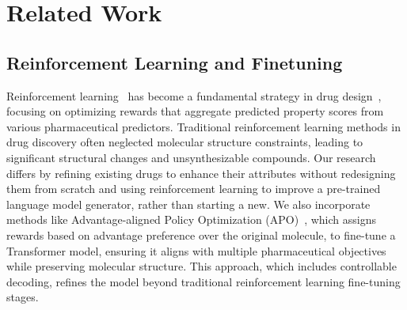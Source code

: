 \section{Related Work}
\label{sec:related}





































\subsection{Reinforcement Learning and Finetuning}





Reinforcement learning~\citep{tan2022reinforcement}  has become a fundamental strategy in drug design~\citep{born2021paccmannrl, guimaraes2017objective, neil2018exploring, olivecrona2017molecular, popova2018deep,  staahl2019deep, tan2022drlinker, wang2022reinforcement, zhang2023universal, zhou2019optimization}, focusing on optimizing rewards that aggregate predicted property scores from various pharmaceutical predictors. Traditional reinforcement learning methods in drug discovery often neglected molecular structure constraints, leading to significant structural changes and unsynthesizable compounds. Our research differs by refining existing drugs to enhance their attributes without redesigning them from scratch and using reinforcement learning to improve a pre-trained language model generator, rather than starting a new. We also incorporate methods like Advantage-aligned Policy Optimization (APO)~\citep{liu2023drugimprover}, which assigns rewards based on advantage preference over the original molecule, to fine-tune a Transformer model, ensuring it aligns with multiple pharmaceutical objectives while preserving molecular structure. This approach, which includes controllable decoding, refines the model beyond traditional reinforcement learning fine-tuning stages.


























